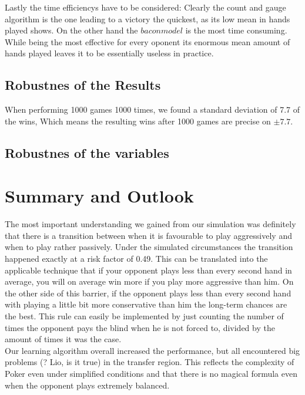 \documentclass[11pt]{article}
\begin{document}
Lastly the time efficiencys have to be considered: Clearly the count and gauge algorithm is the one leading to a victory the quickest, as its low mean in hands played shows. On the other hand the $bacon model$ is the most time consuming. While being the most effective for every oponent its enormous mean amount of hands played leaves it to be essentially useless in practice.




\subsection{Robustnes of the Results}
When performing 1000 games 1000 times, we found a standard deviation of 7.7 of the wins, Which means the resulting wins after 1000 games are precise on $\pm 7.7$.
\subsection{Robustnes of the variables}




\section{Summary and Outlook}

The most important understanding we gained from our simulation was definitely that there is a transition between when it is favourable to play aggressively and when to play rather passively. Under the simulated circumstances the transition happened exactly at a risk factor of 0.49. This can be translated into the applicable technique that if your opponent plays less than every second hand in average, you will on average win more if you play more aggressive than him. On the other side of this barrier, if the opponent plays less than every second hand with playing a little bit more conservative than him the long-term chances are the best. This rule can easily be implemented by just counting the number of times the opponent pays the blind when he is not forced to, divided by the amount of times it was the case.\\

Our learning algorithm overall increased the performance, but all encountered big problems (? Lio, is it true) in the transfer region. This reflects the complexity of Poker even under simplified conditions and that there is no magical formula even when the opponent plays extremely balanced.\\
\end{document}
